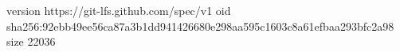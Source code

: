 version https://git-lfs.github.com/spec/v1
oid sha256:92ebb49ee56ca87a3b1dd941426680e298aa595c1603c8a61efbaa293bfc2a98
size 22036
